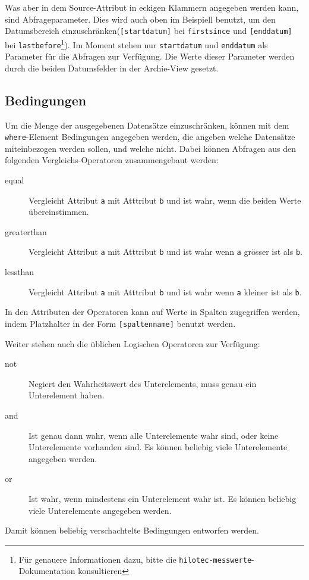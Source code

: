 \documentclass[a4paper]{scrartcl}
\begin{document}
Was aber in dem Source-Attribut in eckigen Klammern angegeben werden kann, sind
Abfrageparameter. Dies wird auch oben im Beispiell benutzt, um den Datumsbereich
einzuschränken(\texttt{[startdatum]} bei \texttt{firstsince} und
\texttt{[enddatum]} bei \texttt{lastbefore}\footnote{Für genauere Informationen
dazu, bitte die \texttt{hilotec-messwerte}-Dokumentation konsultieren}). Im
Moment stehen nur \texttt{startdatum} und \texttt{enddatum} als Parameter für
die Abfragen zur Verfügung. Die Werte dieser Parameter werden durch die beiden
Datumsfelder in der Archie-View gesetzt.


\subsection{Bedingungen}
Um die Menge der ausgegebenen Datensätze einzuschränken, können mit dem
\texttt{where}-Element Bedingungen angegeben werden, die angeben welche
Datensätze miteinbezogen werden sollen, und welche nicht. Dabei können Abfragen
aus den folgenden Vergleichs-Operatoren zusammengebaut werden:
\begin{description}
  \item[equal] Vergleicht Attribut \texttt{a} mit Atttribut \texttt{b} und ist
               wahr, wenn die beiden Werte übereinstimmen.
  \item[greaterthan] Vergleicht Attribut \texttt{a} mit Atttribut \texttt{b} und
                     ist wahr wenn \texttt{a} grösser ist als \texttt{b}.
  \item[lessthan] Vergleicht Attribut \texttt{a} mit Atttribut \texttt{b} und
                  ist wahr wenn \texttt{a} kleiner ist als \texttt{b}.
\end{description}
In den Attributen der Operatoren kann auf Werte in Spalten zugegriffen werden,
indem Platzhalter in der Form \texttt{[spaltenname]} benutzt werden.

Weiter stehen auch die üblichen Logischen Operatoren zur Verfügung:
\begin{description}
  \item[not] Negiert den Wahrheitswert des Unterelements, muss genau ein
             Unterelement haben.
  \item[and] Ist genau dann wahr, wenn alle Unterelemente wahr sind, oder keine
             Unterelemente vorhanden sind. Es können beliebig viele
             Unterelemente angegeben werden.
  \item[or] Ist wahr, wenn mindestens ein Unterelement wahr ist. Es können
            beliebig viele Unterelemente angegeben werden.
\end{description}
Damit können beliebig verschachtelte Bedingungen entworfen werden.
\end{document}
